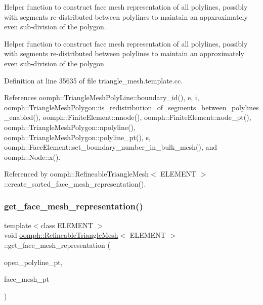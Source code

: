 Helper function to construct face mesh representation of all polylines, possibly with segments re-\/distributed between polylines to maintain an appxroximately even sub-\/division of the polygon. 

Helper function to construct face mesh representation of all polylines, possibly with segments re-\/distributed between polylines to maintain an approximately even sub-\/division of the polygon 

Definition at line 35635 of file triangle\+\_\+mesh.\+template.\+cc.



References oomph\+::\+Triangle\+Mesh\+Poly\+Line\+::boundary\+\_\+id(), e, i, oomph\+::\+Triangle\+Mesh\+Polygon\+::is\+\_\+redistribution\+\_\+of\+\_\+segments\+\_\+between\+\_\+polylines\+\_\+enabled(), oomph\+::\+Finite\+Element\+::nnode(), oomph\+::\+Finite\+Element\+::node\+\_\+pt(), oomph\+::\+Triangle\+Mesh\+Polygon\+::npolyline(), oomph\+::\+Triangle\+Mesh\+Polygon\+::polyline\+\_\+pt(), s, oomph\+::\+Face\+Element\+::set\+\_\+boundary\+\_\+number\+\_\+in\+\_\+bulk\+\_\+mesh(), and oomph\+::\+Node\+::x().



Referenced by oomph\+::\+Refineable\+Triangle\+Mesh$<$ E\+L\+E\+M\+E\+N\+T $>$\+::create\+\_\+sorted\+\_\+face\+\_\+mesh\+\_\+representation().

\mbox{\label{classoomph_1_1RefineableTriangleMesh_a8e233cfcfb0b0e5b287c347f31980786}} 
\subsubsection{\texorpdfstring{get\+\_\+face\+\_\+mesh\+\_\+representation()}{get\_face\_mesh\_representation()}\hspace{0.1cm}{\footnotesize\ttfamily [2/2]}}
{\footnotesize\ttfamily template$<$class E\+L\+E\+M\+E\+NT $>$ \\
void \hyperlink{classoomph_1_1RefineableTriangleMesh}{oomph\+::\+Refineable\+Triangle\+Mesh}$<$ E\+L\+E\+M\+E\+NT $>$\+::get\+\_\+face\+\_\+mesh\+\_\+representation (\begin{DoxyParamCaption}\item[{\hyperlink{classoomph_1_1TriangleMeshOpenCurve}{Triangle\+Mesh\+Open\+Curve} $\ast$}]{open\+\_\+polyline\+\_\+pt,  }\item[{\hyperlink{classoomph_1_1Vector}{Vector}$<$ \hyperlink{classoomph_1_1Mesh}{Mesh} $\ast$$>$ \&}]{face\+\_\+mesh\+\_\+pt }\end{DoxyParamCaption})\hspace{0.3cm}{\ttfamily [protected]}}



